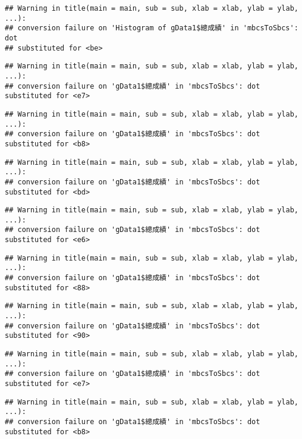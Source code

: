 \documentclass[
]{book}
\begin{document}
\begin{verbatim}
## Warning in title(main = main, sub = sub, xlab = xlab, ylab = ylab, ...):
## conversion failure on 'Histogram of gData1$總成績' in 'mbcsToSbcs': dot
## substituted for <be>
\end{verbatim}

\begin{verbatim}
## Warning in title(main = main, sub = sub, xlab = xlab, ylab = ylab, ...):
## conversion failure on 'gData1$總成績' in 'mbcsToSbcs': dot substituted for <e7>
\end{verbatim}

\begin{verbatim}
## Warning in title(main = main, sub = sub, xlab = xlab, ylab = ylab, ...):
## conversion failure on 'gData1$總成績' in 'mbcsToSbcs': dot substituted for <b8>
\end{verbatim}

\begin{verbatim}
## Warning in title(main = main, sub = sub, xlab = xlab, ylab = ylab, ...):
## conversion failure on 'gData1$總成績' in 'mbcsToSbcs': dot substituted for <bd>
\end{verbatim}

\begin{verbatim}
## Warning in title(main = main, sub = sub, xlab = xlab, ylab = ylab, ...):
## conversion failure on 'gData1$總成績' in 'mbcsToSbcs': dot substituted for <e6>
\end{verbatim}

\begin{verbatim}
## Warning in title(main = main, sub = sub, xlab = xlab, ylab = ylab, ...):
## conversion failure on 'gData1$總成績' in 'mbcsToSbcs': dot substituted for <88>
\end{verbatim}

\begin{verbatim}
## Warning in title(main = main, sub = sub, xlab = xlab, ylab = ylab, ...):
## conversion failure on 'gData1$總成績' in 'mbcsToSbcs': dot substituted for <90>
\end{verbatim}

\begin{verbatim}
## Warning in title(main = main, sub = sub, xlab = xlab, ylab = ylab, ...):
## conversion failure on 'gData1$總成績' in 'mbcsToSbcs': dot substituted for <e7>
\end{verbatim}

\begin{verbatim}
## Warning in title(main = main, sub = sub, xlab = xlab, ylab = ylab, ...):
## conversion failure on 'gData1$總成績' in 'mbcsToSbcs': dot substituted for <b8>
\end{verbatim}
\end{document}
